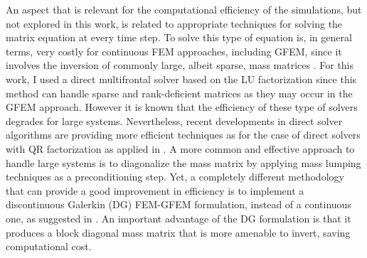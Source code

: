 An aspect that is relevant for the computational efficiency of the simulations, but not explored in this work, is related to appropriate techniques for solving the matrix equation at every time step. To solve this type of equation is, in general terms, very costly for continuous FEM approaches, including GFEM, since it involves the inversion of commonly large, albeit sparse, mass matrices \cite{DeBasabe2009}. For this work, I used a direct multifrontal solver based on the LU factorization since this method can handle sparse and rank-deficient matrices as they may occur in the GFEM approach. However it is known that the efficiency of these type of solvers degrades for large systems. Nevertheless, recent developments in direct solver algorithms are providing more efficient techniques as for the case of direct solvers with QR factorization as applied in \cite{Bogiatzis2016}. A more common and effective approach to handle large systems is to diagonalize the  mass matrix by applying mass lumping techniques \cite{JENSEN1996} as a preconditioning step.  Yet, a completely different methodology that can provide a good improvement in efficiency is to implement a discontinuous Galerkin (DG) FEM-GFEM formulation, instead of a continuous one,  as suggested in \cite{Hiptmair2016}. An important advantage of the DG formulation is that it produces a block diagonal mass matrix \cite{Grote2006} that is more amenable to invert, saving computational cost. 






